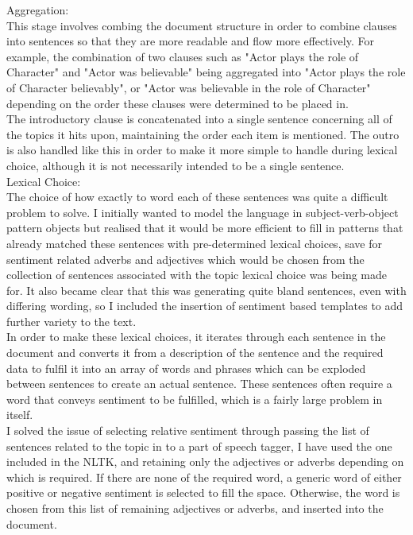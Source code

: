 Aggregation:\\
This stage involves combing the document structure in order to combine clauses into sentences so that they are more readable and flow more effectively. For example, the combination of two clauses such as "Actor plays the role of Character" and "Actor was believable" being aggregated into "Actor plays the role of Character believably", or "Actor was believable in the role of Character" depending on the order these clauses were determined to be placed in.\\
The introductory clause is concatenated into a single sentence concerning all of the topics it hits upon, maintaining the order each item is mentioned. The outro is also handled like this in order to make it more simple to handle during lexical choice, although it is not necessarily intended to be a single sentence.\\


Lexical Choice:\\
The choice of how exactly to word each of these sentences was quite a difficult problem to solve. I initially wanted to model the language in subject-verb-object pattern objects but realised that it would be more efficient to fill in patterns that already matched these sentences with pre-determined lexical choices, save for sentiment related adverbs and adjectives which would be chosen from the collection of sentences associated with the topic lexical choice was being made for. It also became clear that this was generating quite bland sentences, even with differing wording, so I included the insertion of sentiment based templates to add further variety to the text.\\
In order to make these lexical choices, it iterates through each sentence in the document and converts it from a description of the sentence and the required data to fulfil it into an array of words and phrases which can be exploded between sentences to create an actual sentence. These sentences often require a word that conveys sentiment to be fulfilled, which is a fairly large problem in itself.\\
I solved the issue of selecting relative sentiment through passing the list of sentences related to the topic in to a part of speech tagger, I have used the one included in the NLTK, and retaining only the adjectives or adverbs depending on which is required. If there are none of the required word, a generic word of either positive or negative sentiment is selected to fill the space. Otherwise, the word is chosen from this list of remaining adjectives or adverbs, and inserted into the document.\\

